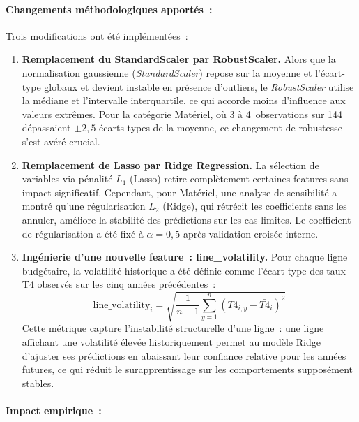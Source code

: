 \paragraph{Changements m\'ethodologiques apport\'es~:}

Trois modifications ont \'et\'e impl\'ement\'ees~:

\begin{enumerate}
    \item \textbf{Remplacement du StandardScaler par RobustScaler.} Alors que la
    normalisation gaussienne (\textit{StandardScaler}) repose sur la moyenne et
    l'\'ecart-type globaux et devient instable en pr\'esence d'outliers, le
    \textit{RobustScaler} utilise la m\'ediane et l'intervalle interquartile, ce
    qui accorde moins d'influence aux valeurs extr\^emes. Pour la cat\'egorie
    Mat\'eriel, o\`u 3 \`a 4~observations sur 144 d\'epassaient $\pm 2{,}5$
    \'ecarts-types de la moyenne, ce changement de robustesse s'est av\'er\'e crucial.

    \item \textbf{Remplacement de Lasso par Ridge Regression.} La s\'election de
    variables via p\'enalit\'e $L_1$ (Lasso) retire compl\`etement certaines
    features sans impact significatif. Cependant, pour Mat\'eriel, une analyse de
    sensibilit\'e a montr\'e qu'une r\'egularisation $L_2$ (Ridge), qui r\'etr\'ecit
    les coefficients sans les annuler, am\'eliore la stabilit\'e des pr\'edictions
    sur les cas limites. Le coefficient de r\'egularisation a \'et\'e fix\'e \`a
    $\alpha = 0{,}5$ apr\`es validation crois\'ee interne.

    \item \textbf{Ing\'enierie d'une nouvelle feature~: line\_volatility.} Pour
    chaque ligne budg\'etaire, la volatilit\'e historique a \'et\'e d\'efinie comme
    l'\'ecart-type des taux T4 observ\'es sur les cinq ann\'ees pr\'ec\'edentes~:
    $$\text{line\_volatility}_i = \sqrt{\frac{1}{n-1}\sum_{y=1}^{n}(T4_{i,y} - \bar{T4}_i)^2}$$
    Cette m\'etrique capture l'instabilit\'e structurelle d'une ligne~: une ligne
    affichant une volatilit\'e \'elev\'ee historiquement permet au mod\`ele Ridge
    d'ajuster ses pr\'edictions en abaissant leur confiance relative pour les
    ann\'ees futures, ce qui r\'eduit le surapprentissage sur les comportements
    suppos\'ement stables.
\end{enumerate}

\paragraph{Impact empirique~:}

